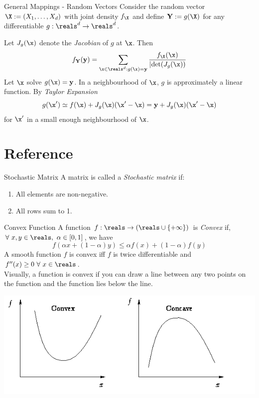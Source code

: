 \documentclass[11pt,a4paper]{article}
\begin{document}
  \begin{proposition}{General Mappings - Random Vectors}
    Consider the random vector $\X:=(X_1,\dots,X_d)$ with joint density $f_\X$ and define $\mathbf{Y}:=g(\X)$ for any differentiable $g:\reals^d\to\reals^d$.
    \par Let $J_g(\x)$ denote the \textit{Jacobian} of $g$ at $\x$. Then
    \[ f_\mathbf{Y}(\mathbf{y})=\sum_{\x\in\reals^d:g(\x)=\mathbf{y}}\frac{f_\X(\x)}{|\text{det}(J_g(\x))} \]
    Let $\x$ solve $g(\x)=\mathbf{y}$. In a neighbourhood of $\x$, $g$ is approximately a linear function. By \textit{Taylor Expansion}
    \[ g(\x')\simeq f(\x)+J_g(\x)(\x'-\x)=\mathbf{y}+J_g(\x)(\x'-\x) \]
    for $\x'$ in a small enough neighbourhood of $\x$.
  \end{proposition}

\newpage
\setcounter{section}{-1}
\section{Reference}

  \begin{definition}{Stochastic Matrix}
    A matrix is called a \textit{Stochastic matrix} if:
    \begin{enumerate}
      \item All elements are non-negative.
      \item All rows sum to 1.
    \end{enumerate}
  \end{definition}

  \begin{definition}{Convex Function}
    A function $f:\reals\to(\reals\cup\{+\infty\})$ is \textit{Convex} if, $\forall\ x,y\in\reals,\ \alpha\in[0,1]$, we have
    \[ f(\alpha x+(1-\alpha)y)\leq\alpha f(x)+(1-\alpha)f(y) \]
    A smooth function $f$ is convex iff $f$ is twice differentiable and $f''(x)\geq0\ \forall\ x\in\reals$.\\
    Visually, a function is convex if you can draw a line between any two points on the function and the function lies below the line.
    \begin{center}
      \includegraphics[scale=.5]{convex_concave.png}
    \end{center}
  \end{definition}
\end{document}
